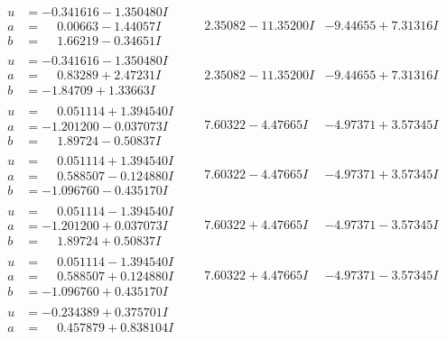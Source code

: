 \documentclass[1p]{elsarticle_modified}
\theoremstyle{definition}
\begin{document}
$$\begin{array}{c|c|c}
 \hline 
\begin{aligned}
u &= -0.341616 - 1.350480 I \\
a &= \phantom{-}0.00663 - 1.44057 I \\
b &= \phantom{-}1.66219 - 0.34651 I\end{aligned}
 & \phantom{-}2.35082 - 11.35200 I & -9.44655 + 7.31316 I \\ \hline\begin{aligned}
u &= -0.341616 - 1.350480 I \\
a &= \phantom{-}0.83289 + 2.47231 I \\
b &= -1.84709 + 1.33663 I\end{aligned}
 & \phantom{-}2.35082 - 11.35200 I & -9.44655 + 7.31316 I \\ \hline\begin{aligned}
u &= \phantom{-}0.051114 + 1.394540 I \\
a &= -1.201200 - 0.037073 I \\
b &= \phantom{-}1.89724 - 0.50837 I\end{aligned}
 & \phantom{-}7.60322 - 4.47665 I & -4.97371 + 3.57345 I \\ \hline\begin{aligned}
u &= \phantom{-}0.051114 + 1.394540 I \\
a &= \phantom{-}0.588507 - 0.124880 I \\
b &= -1.096760 - 0.435170 I\end{aligned}
 & \phantom{-}7.60322 - 4.47665 I & -4.97371 + 3.57345 I \\ \hline\begin{aligned}
u &= \phantom{-}0.051114 - 1.394540 I \\
a &= -1.201200 + 0.037073 I \\
b &= \phantom{-}1.89724 + 0.50837 I\end{aligned}
 & \phantom{-}7.60322 + 4.47665 I & -4.97371 - 3.57345 I \\ \hline\begin{aligned}
u &= \phantom{-}0.051114 - 1.394540 I \\
a &= \phantom{-}0.588507 + 0.124880 I \\
b &= -1.096760 + 0.435170 I\end{aligned}
 & \phantom{-}7.60322 + 4.47665 I & -4.97371 - 3.57345 I \\ \hline\begin{aligned}
u &= -0.234389 + 0.375701 I \\
a &= \phantom{-}0.457879 + 0.838104 I \\

\end{aligned}
\end{array}$$
\end{document}
